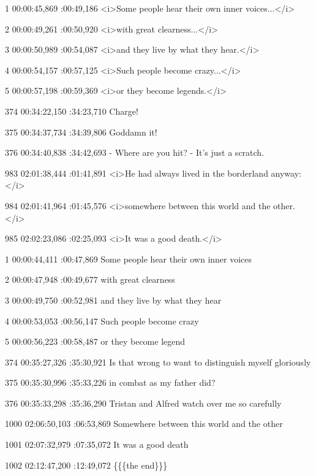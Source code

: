 \begin{subexam}
1
00:00:45,869 :00:49,186
<i>Some people hear 
their own inner voices...</i>

2
00:00:49,261 :00:50,920
<i>with great clearness...</i>

3
00:00:50,989 :00:54,087
<i>and they live by what they hear.</i>

4
00:00:54,157 :00:57,125
<i>Such people become crazy...</i>

5
00:00:57,198 :00:59,369
<i>or they become legends.</i>

374
00:34:22,150 :34:23,710
Charge!

375
00:34:37,734 :34:39,806
Goddamn it!

376
00:34:40,838 :34:42,693
- Where are you hit?
- It's just a scratch.

983
02:01:38,444 :01:41,891
<i>He had always lived
in the borderland anyway:</i>

984
02:01:41,964 :01:45,576
<i>somewhere between this world
and the other.</i>

985
02:02:23,086 :02:25,093
<i>It was a good death.</i>
\end{subexam}
\hspace{0.5cm}
\begin{subexam}
1
00:00:44,411 :00:47,869
Some people hear their own
inner voices

2
00:00:47,948 :00:49,677
with great clearness

3
00:00:49,750 :00:52,981
and they live
by what they hear

4
00:00:53,053 :00:56,147
Such people become crazy

5
00:00:56,223 :00:58,487
or they become legend

374
00:35:27,326 :35:30,921
Is that wrong to want
to distinguish myself gloriously

375
00:35:30,996 :35:33,226
in combat as my father did?

376
00:35:33,298 :35:36,290
Tristan and Alfred
watch over me so carefully

1000
02:06:50,103 :06:53,869
Somewhere between this world
and the other

1001
02:07:32,979 :07:35,072
It was a good death

1002
02:12:47,200 :12:49,072
\{\{\{the end\}\}\}
\end{subexam}


